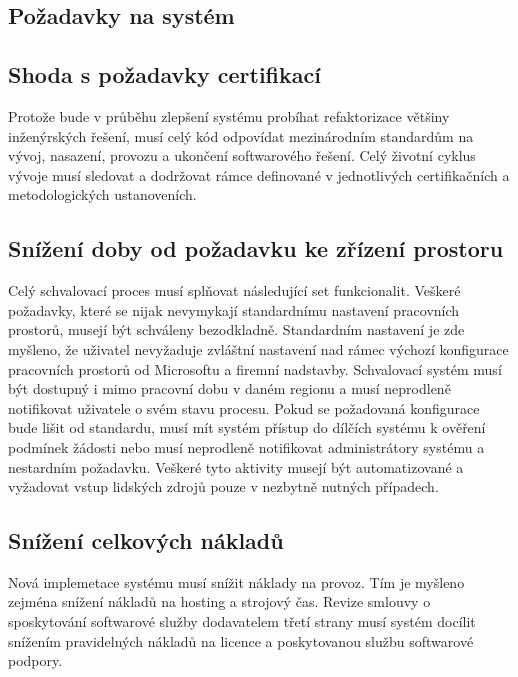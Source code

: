 \documentclass[12pt]{article}
\begin{document}
\begin{sloppypar}
\begin{spacing}{1.15}
        \section*{Požadavky na systém}
        \subsection*{Shoda s požadavky certifikací}
        Protože bude v průběhu zlepšení systému probíhat refaktorizace většiny
        inženýrských řešení, musí celý kód odpovídat mezinárodním standardům na
        vývoj, nasazení, provozu a ukončení softwarového řešení. Celý životní
        cyklus vývoje musí sledovat a dodržovat rámce definované v jednotlivých
        certifikačních a metodologických ustanoveních.

        \subsection*{Snížení doby od požadavku ke zřízení prostoru}
        Celý schvalovací proces musí splňovat následující set funkcionalit.
        Veškeré požadavky, které se nijak nevymykají standardnímu nastavení
        pracovních prostorů, musejí být schváleny bezodkladně. Standardním
        nastavení je zde myšleno, že uživatel nevyžaduje zvláštní nastavení nad
        rámec výchozí konfigurace pracovních prostorů od Microsoftu a firemní
        nadstavby. Schvalovací systém musí být dostupný i mimo pracovní dobu v
        daném regionu a musí neprodleně notifikovat uživatele o svém stavu
        procesu. Pokud se požadovaná konfigurace bude lišit od standardu, musí
        mít systém přístup do dílčích systému k ověření podmínek žádosti nebo
        musí neprodleně notifikovat administrátory systému a nestardním
        požadavku. Veškeré tyto aktivity musejí být automatizované a vyžadovat
        vstup lidských zdrojů pouze v nezbytně nutných případech. 
        
        \subsection*{Snížení celkových nákladů}
        Nová implemetace systému musí snížit náklady na provoz. Tím je myšleno
        zejména snížení nákladů na hosting a strojový čas. Revize smlouvy o
        sposkytování softwarové služby dodavatelem třetí strany musí systém
        docílit snížením pravidelných nákladů na licence a poskytovanou službu
        softwarové podpory.


\end{spacing}
\end{sloppypar}
\end{document}

